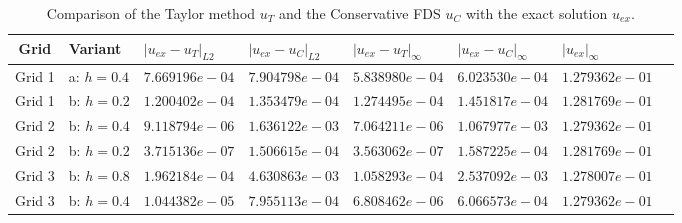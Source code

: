 \documentclass[%
 aip,
cp,  
 amsmath,amssymb,
 reprint,
]{iopconfser}
\begin{document}
\begin{table}[ht]
\centering
\small
		\begin{tabular}{|c|l|l|l|l|l|l|l|}
			\hline
           Grid                    & Variant   &    $|u_{ex}-u_{T}|_{L2}$  &    $|u_{ex}-u_{C}|_{L2}$  &   $|u_{ex}-u_T|_{\infty}$ &   $|u_{ex}-u_C|_{\infty}$   &  $|u_{ex}|_{\infty}$      \\
			\hline
           Grid 1          &     a:  $h=0.4$  &  $ 7.669196e-04$       &     $7.904798e-04$               &     $5.838980e-04$           &               $6.023530e-04$     &       $1.279362e-01$ \\
			\hline
           Grid 1          &     b:  $h=0.2$  &  $ 1.200402e-04$       &     $1.353479e-04$               &     $1.274495e-04$           &               $1.451817e-04$     &       $1.281769e-01$ \\
			\hline
           Grid 2          &     b:  $h=0.4$  &  $ 9.118794e-06$       &     $1.636122e-03$               &     $7.064211e-06$           &               $1.067977e-03$     &       $1.279362e-01$ \\
			\hline
           Grid 2          &     b:  $h=0.2$  &  $ 3.715136e-07$       &     $ 1.506615e-04$               &     $3.563062e-07$           &               $1.587225e-04$     &       $1.281769e-01$ \\
			\hline
           Grid 3          &     b:  $h=0.8$  &  $ 1.962184e-04$       &     $ 4.630863e-03$               &     $1.058293e-04$           &               $2.537092e-03$     &       $1.278007e-01$ \\
			\hline
           Grid 3          &     b:  $h=0.4$  &  $ 1.044382e-05$       &     $  7.955113e-04$               &     $ 6.808462e-06$           &               $6.066573e-04$     &       $1.279362e-01$ \\
			\hline
		\end{tabular}
	\caption{ Comparison of the Taylor method  $u_{T}$ and the Conservative FDS $u_{C}$ with the exact solution $u_{ex}$.}
	\label{compareTable}
\end{table}
\end{document}

